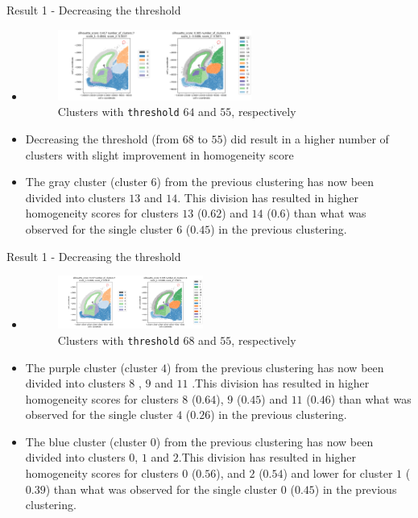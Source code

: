 \documentclass{beamer}
\begin{document}
\begin{frame}{Result 1 - Decreasing the threshold}
\begin{itemize}
    \item<1-> []
   	 \begin{figure}
    		\includegraphics[width=0.6\textwidth]{clusters_1_2.png}
    		\caption{Clusters with \texttt{threshold} $64$ and $55$, respectively}
	\end{figure} 
    \item<2-> Decreasing the threshold (from $68$ to $55$) did result in a higher number of clusters with slight improvement in homogeneity score
    \item<3-> The gray cluster (cluster $6$) from the previous clustering has now been divided into clusters $13$ and $14$. This division has resulted in higher homogeneity scores for clusters $13$ ($0.62$) and $14$ ($0.6$) than what was observed for the single cluster $6$ ($0.45$) in the previous clustering. 
\end{itemize}

\end{frame}
\begin{frame}{Result 1 - Decreasing the threshold}
\begin{itemize}
      \item<1-> []
     	 \begin{figure}
    		\includegraphics[width=0.45\textwidth]{clusters_1_2.png}
   		 \caption{Clusters with \texttt{threshold} $68$ and $55$, respectively}
	\end{figure} 
     \item<2-> The purple cluster (cluster $4$) from the previous clustering has now been divided into clusters $8$ , $9$ and $11$ .This division has resulted in higher homogeneity scores for clusters $8$ ($0.64$), $9$ ($0.45$) and $11$ ($0.46$) than what was observed for the single cluster $4$ ($0.26$) in the previous clustering. 
    \item<3-> The blue cluster (cluster $0$) from the previous clustering has now been divided into clusters $0$, $1$  and $2$.This division has resulted in higher homogeneity scores for clusters $0$ ($0.56$), and $2$ ($0.54$) and lower for cluster $1$ ($0.39$) than what was observed for the single cluster $0$ ($0.45$) in the previous clustering. 
\end{itemize}

\end{frame}
\end{document}
